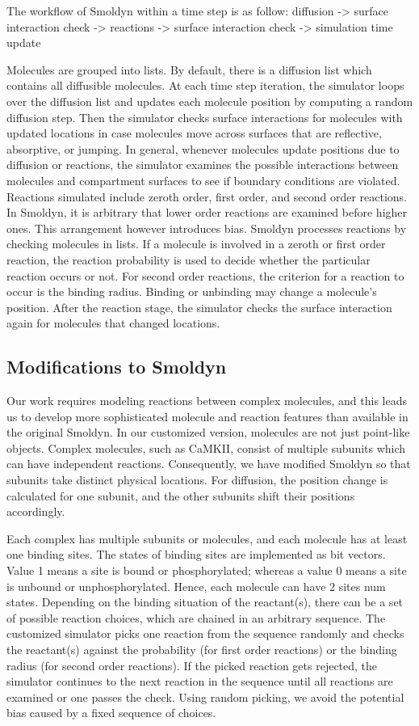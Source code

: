 The workflow of Smoldyn within a time step is as follow:
diffusion -> surface interaction check -> reactions -> surface interaction check -> simulation time update


Molecules are grouped into lists. By default, there is a diffusion list which contains all diffusible molecules. At each time step iteration, the simulator loops over the diffusion list and updates each molecule position by computing a random diffusion step. Then the simulator checks surface interactions for molecules with updated locations in case molecules move across surfaces that are reflective, absorptive, or jumping. In general, whenever molecules update positions due to diffusion or reactions, the simulator examines the possible interactions between molecules and compartment surfaces to see if boundary conditions are violated. Reactions simulated include zeroth order, first order, and second order reactions. In Smoldyn, it is arbitrary that lower order reactions are examined before higher ones. This arrangement however introduces bias. Smoldyn processes reactions by checking molecules in lists. If a molecule is involved in a zeroth or first order reaction, the reaction probability is used to decide whether the particular reaction occurs or not. For second order reactions, the criterion for a reaction to occur is the binding radius. Binding or unbinding may change a molecule’s position. After the reaction stage, the simulator checks the surface interaction again for molecules that changed locations.


\subsection{Modifications to Smoldyn}
Our work requires modeling reactions between complex molecules, and this leads us to develop more sophisticated molecule and reaction features than available in the original Smoldyn. In our customized version, molecules are not just point-like objects. Complex molecules, such as CaMKII, consist of multiple subunits which can have independent reactions. Consequently, we have modified Smoldyn so that subunits take distinct physical locations. For diffusion, the position change is calculated for one subunit, and the other subunits shift their positions accordingly.

Each complex has multiple subunits or molecules, and each molecule has at least one binding sites. The states of binding sites are implemented as bit vectors. Value 1 means a site is bound or phosphorylated; whereas a value 0 means a site is unbound or unphosphorylated. Hence, each molecule can have 2 sites num states. Depending on the binding situation of the reactant(s), there can be a set of possible reaction choices, which are chained in an arbitrary sequence. The customized simulator picks one reaction from the sequence randomly and checks the reactant(s) against the probability (for first order reactions) or the binding radius (for second order reactions). If the picked reaction gets rejected, the simulator continues to the next reaction in the sequence until all reactions are examined or one passes the check. Using random picking, we avoid the potential bias caused by a fixed sequence of choices.

